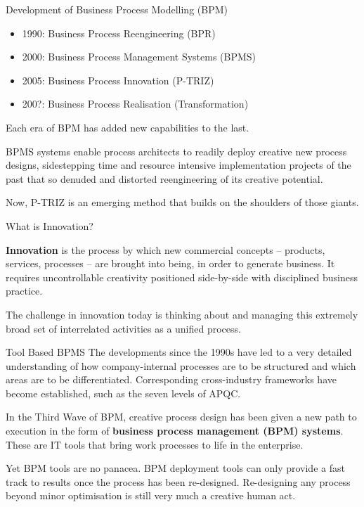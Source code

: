 \documentclass{beamer}
\title{P-TRIZ in the History of Business Processes\vskip1em}
\subtitle{Research Seminar in the Module 10-202-2312\\ for Master Computer
  Science}
\author{Prof. Dr. Hans-Gert Gräbe\\
\url{http://www.informatik.uni-leipzig.de/~graebe}}
\date{May 10, 2022}
\begin{document}
{
\begin{frame}
  \titlepage
\end{frame}}

\begin{frame}{Development of Business Process Modelling (BPM)} 

\begin{itemize}
\item 1990: Business Process Reengineering (BPR)
\item 2000: Business Process Management Systems (BPMS)
\item 2005: Business Process Innovation (P-TRIZ)
\item 200?: Business Process Realisation (Transformation)
\end{itemize}

Each era of BPM has added new capabilities to the last.

BPMS systems enable process architects to readily deploy creative new process
designs, sidestepping time and resource intensive implementation projects of
the past that so denuded and distorted reengineering of its creative
potential.

Now, P-TRIZ is an emerging method that builds on the shoulders of those
giants.

\end{frame}

\begin{frame}{What is Innovation?}

\textbf{Innovation} is the process by which new commercial concepts –
products, services, processes – are brought into being, in order to generate
business. It requires uncontrollable creativity positioned side-by-side with
disciplined business practice.

The challenge in innovation today is thinking about and managing this
extremely broad set of interrelated activities as a unified process.
\end{frame}

\begin{frame}{Tool Based BPMS}
The developments since the 1990s have led to a very detailed understanding of
how company-internal processes are to be structured and which areas are to be
differentiated.  Corresponding cross-industry frameworks have become
established, such as the seven levels of APQC.

In the Third Wave of BPM, creative process design has been given a new path to
execution in the form of \textbf{business process management (BPM)
  systems}. These are IT tools that bring work processes to life in the
enterprise.

Yet BPM tools are no panacea. BPM deployment tools can only provide a fast
track to results once the process has been re-designed. Re-designing any
process beyond minor optimisation is still very much a creative human act.
\end{frame}
\end{document}
